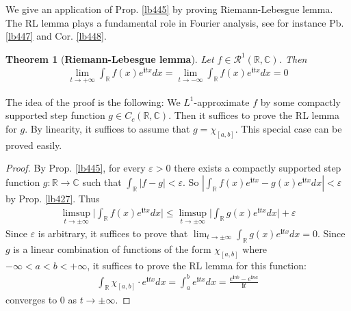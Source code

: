 \documentclass[12pt,b5paper,notitlepage]{article}
\theoremstyle{definition}
\theoremstyle{plain}
\newtheorem{thm}[df]{Theorem}
\newcommand{\scr}{\mathscr}
\newcommand{\im}{\mathbf{i}}
\newcommand{\Cbb}{\mathbb C}
\newcommand{\Rbb}{\mathbb R}
\newcommand{\eps}{\varepsilon}
\numberwithin{equation}{section}
\begin{document}
We give an application of Prop. \ref{lb445} by proving Riemann-Lebesgue lemma. The RL lemma plays a fundamental role in Fourier analysis, see for instance Pb. \ref{lb447} and Cor. \ref{lb448}. 


\begin{thm}[\textbf{Riemann-Lebesgue lemma}] 
Let $f\in\scr R^1(\Rbb,\Cbb)$. Then
\begin{align*}
\lim_{t\rightarrow+\infty}\int_\Rbb f(x)e^{\im tx}dx=\lim_{t\rightarrow-\infty}\int_\Rbb f(x)e^{\im tx}dx=0
\end{align*}
\end{thm}

The idea of the proof is the following: We $L^1$-approximate $f$ by some compactly supported step function $g\in C_c(\Rbb,\Cbb)$. Then it suffices to prove the RL lemma for $g$. By linearity, it suffices to assume that $g=\chi_{[a,b]}$. This special case can be proved easily. 

\begin{proof}
By Prop. \ref{lb445}, for every $\eps>0$ there exists a compactly supported step function $g:\Rbb\rightarrow\Cbb$ such that  $\int_\Rbb|f-g|<\eps$. So $|\int_\Rbb f(x)e^{\im tx}-g(x)e^{\im tx}dx|<\eps$ by Prop. \ref{lb427}. Thus
\begin{align*}
\limsup_{t\rightarrow\pm\infty} \Big| \int_\Rbb f(x)e^{\im tx}dx\Big|\leq \limsup_{t\rightarrow\pm\infty} \Big|\int_\Rbb g(x)e^{\im tx}dx\Big|+\eps
\end{align*}
Since $\eps$ is arbitrary, it suffices to prove that $\lim_{t\rightarrow\pm\infty}\int_\Rbb g(x)e^{\im tx}dx=0$. Since $g$ is a linear combination of functions of the form $\chi_{[a,b]}$ where $-\infty<a<b<+\infty$, it suffices to prove the RL lemma for this function:
\begin{align*}
\int_\Rbb\chi_{[a,b]}\cdot e^{\im tx}dx=\int_a^b e^{\im tx}dx=\frac{e^{\im nb}-e^{\im na}}{\im t}
\end{align*}
converges to $0$ as $t\rightarrow\pm\infty$.
\end{proof}
\end{document}
